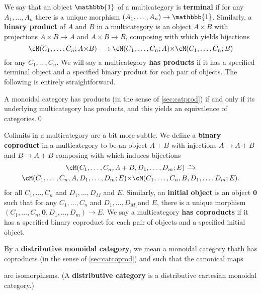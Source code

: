 \documentclass{book}
\def\unit{\mathbbb{1}}%
\def\zero{\mathbf{0}}
\let\tensor\otimes
\begin{document}
We say that an object $\unit$ of a multicategory is \textbf{terminal} if for any $A_1,\dots, A_n$ there is a unique morphism $(A_1,\dots, A_n)\to \unit$.
Similarly, a \textbf{binary product} of $A$ and $B$ in a multicategory is an object $A\times B$ with projections $A\times B \to A$ and $A\times B\to B$, composing with which yields bijections
\[ \cM(C_1,\dots,C_n;A\times B) \too \cM(C_1,\dots,C_n;A) \times \cM(C_1,\dots,C_n;B)\]
for any $C_1,\dots,C_n$.
We will say a multicategory \textbf{has products} if it has a specified terminal object and a specified binary product for each pair of objects.
The following is entirely straightforward.

\begin{thm}\label{thm:multicat-prod}
  A monoidal category has products (in the sense of \cref{sec:catprod}) if and only if its underlying multicategory has products, and this yields an equivalence of categories.\qed
\end{thm}

Colimits in a multicategory are a bit more subtle.
We define a \textbf{binary coproduct} in a multicategory \cM to be an object $A+B$ with injections $A\to A+B$ and $B\to A+B$ composing with which induces bijections
\begin{multline*}
  \cM(C_1,\dots,C_n,A+B,D_1,\dots,D_m;E) \toiso\\
  \cM(C_1,\dots,C_n,A,D_1,\dots,D_m;E) \times \cM(C_1,\dots,C_n,B,D_1,\dots,D_m;E).
\end{multline*}
for all $C_1,\dots,C_n$ and $D_1,\dots, D_M$ and $E$.
Similarly, an \textbf{initial object} is an object $\zero$ such that for any $C_1,\dots,C_n$ and $D_1,\dots, D_M$ and $E$, there is a unique morphism $(C_1,\dots,C_n,\zero,D_1,\dots,D_m)\to E$.
We say a multicategory \textbf{has coproducts} if it has a specified binary coproduct for each pair of objects and a specified initial object.

By a \textbf{distributive monoidal category}, we mean a monoidal category thath has coproducts (in the sense of \cref{sec:catcoprod}) and such that the canonical maps
are isomorphisms.
(A \textbf{distributive category} is a distributive cartesian monoidal category.)
\end{document}
